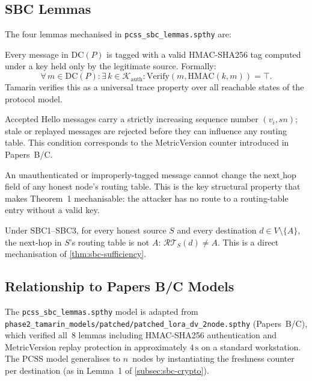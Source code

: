\documentclass[journal,compsoc]{IEEEtran}
\theoremstyle{plain}
\theoremstyle{definition}
\theoremstyle{remark}
\newcommand{\DC}{\mathrm{DC}}
\newcommand{\hmac}{\textsf{HMAC-SHA256}}
\begin{document}
\subsection{SBC Lemmas}

The four lemmas mechanised in \texttt{pcss\_sbc\_lemmas.spthy} are:

\begin{description}[font=\normalfont\itshape, leftmargin=1.5em]
  \item[L-SBC1 (Authentication Closure).]
    Every message in $\DC(P)$ is tagged with a valid \hmac{} tag computed
    under a key held only by the legitimate source.  Formally:
    \[\forall\, m \in \DC(P)\colon \exists\, k\in\mathcal{K}_{\mathrm{auth}}\colon
      \mathrm{Verify}(m, \mathrm{HMAC}(k,m)) = \top.\]
    Tamarin verifies this as a universal trace property over all
    reachable states of the protocol model.

  \item[L-SBC2 (Freshness / Anti-Replay).]
    Accepted Hello messages carry a strictly increasing sequence number
    $(v_i, \mathit{sn})$; stale or replayed messages are rejected before
    they can influence any routing table.  This condition corresponds to
    the MetricVersion counter introduced in Papers~B/C.

  \item[L-SBC3 (No Unauthenticated Routing Effect).]
    An unauthenticated or improperly-tagged message cannot change the
    $\mathrm{next\_hop}$ field of any honest node's routing table.
    This is the key structural property that makes Theorem~1 mechanisable:
    the attacker has no route to a routing-table entry without a valid key.

  \item[L-Thm1 (Attacker Exclusion).]
    Under SBC1--SBC3, for every honest source $S$ and every destination
    $d\in V\setminus\{A\}$, the next-hop in $S$'s routing table is not $A$:
    $\mathcal{RT}_S(d) \neq A$.  This is a direct mechanisation of
    \cref{thm:sbc-sufficiency}.
\end{description}

\subsection{Relationship to Papers B/C Models}

The \texttt{pcss\_sbc\_lemmas.spthy} model is adapted from
\texttt{phase2\_tamarin\_models/patched/patched\_lora\_dv\_2node.spthy}
(Papers~B/C), which verified all~8 lemmas including \hmac{} authentication
and MetricVersion replay protection in approximately $4\,\text{s}$ on a
standard workstation.  The PCSS model generalises to $n$~nodes by
instantiating the freshness counter per destination (as in
Lemma~1 of \cref{subsec:sbc-crypto}).
\end{document}
